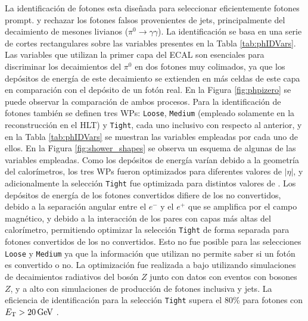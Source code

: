 La identificación de fotones esta diseñada para seleccionar eficientemente fotones prompt. y rechazar los fotones falsos provenientes de jets, principalmente del decaimiento de mesones livianos ($\pi^{0}\to\gamma\gamma$). La identificación se basa en una serie de cortes rectangulares sobre las variables presentes en la Tabla \ref{tab:phIDVars}. Las variables que utilizan la primer capa del ECAL son esenciales para discriminar los decaimientos del $\pi^{0}$ en dos fotones muy colimados, ya que los depósitos de energía de este decaimiento se extienden en más celdas de este capa en comparación con el depósito de un fotón real. En la Figura \ref{fig:phpizero} se puede observar la comparación de ambos procesos. 
Para la identificación de fotones también se definen tres WPs: \texttt{Loose}, \texttt{Medium} (empleado solamente en la reconstrucción en el HLT) y \texttt{Tight}, cada uno inclusivo con respecto al anterior, y en la Tabla \ref{tab:phIDVars} se muestran las variables empleadas por cada uno de ellos. En la Figura \ref{fig:shower_shapes} se observa un esquema de algunas de las variables empleadas.
Como los depósitos de energía varían debido a la geometría del calorímetros, los tres WPs fueron optimizados para diferentes valores de $|\eta|$, y adicionalmente la selección \texttt{Tight} fue optimizada para distintos valores de \ET. Los depósitos de energía de los fotones convertidos difiere de los no convertidos, debido a la separación angular entre el $e^-$ y el $e^+$ que se amplifica por el campo magnético, y debido a la interacción de los pares con capas más altas del calorímetro, permitiendo optimizar la selección \texttt{Tight} de forma separada para fotones convertidos de los no convertidos. Esto no fue posible para las selecciones \texttt{Loose} y \texttt{Medium} ya que la información que utilizan no permite saber si un fotón es convertido o no. La optimización fue realizada a bajo \ET utilizando simulaciones de decaimientos radiativos del bosón $Z$ junto con datos con eventos con bosones $Z$, y a alto \ET con simulaciones de producción de fotones inclusiva y jets. La eficiencia de identificación para la selección \texttt{Tight} supera el 80\% para fotones con $E_{\text{T}}>20\,\text{GeV}$ \cite{EGAM-2018-01}.


